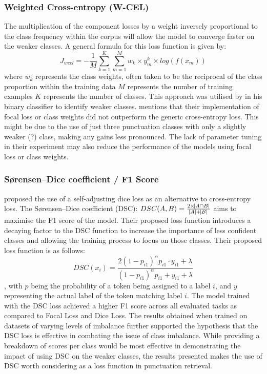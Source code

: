 \documentclass[a4paper]{article}
\begin{document}
\subsubsection{Weighted Cross-entropy (W-CEL)}
The multiplication of the component losses by a weight inversely proportional to the class frequency within the corpus will allow the model to converge faster on the weaker classes. A general formula for this loss function is given by: \[
J_{wcel}=-\frac{1}{M}\sum_{k=1}^{K}\sum_{m=1}^{M}w_k \times y_m^k \times log(f(x_m))
\] where \newline
$w_k$ represents the class weights, often taken to be the reciprocal of the class proportion within the training data \newline
$M$ represents the number of training examples \newline
$K$ represents the number of classes.
This approach was utilised by \cite{adaptivenerunbalanceddata} in his binary classifier to identify weaker classes. \citet{efficientbertrobust} mentions that their implementation of focal loss or class weights did not outperform the generic cross-entropy loss. This might be due to the use of just three punctuation classes with only a slightly weaker (?) class, making any gains less pronounced. The lack of parameter tuning in their experiment may also reduce the performance of the models using focal loss or class weights.

\subsubsection{Sørensen–Dice coefficient / F1 Score}
\citet{li2020dice} proposed the use of a self-adjusting dice loss as an alternative to cross-entropy loss. The Sørensen–Dice coefficient (DSC): $DSC(A,B)=\frac{2 \times\abs{A \cap B}}{\abs{A} + \abs{B}}$ aims to maximise the F1 score of the model. Their proposed loss function introduces a decaying factor to the DSC function to increase the importance of less confident classes and allowing the training process to focus on those classes. Their proposed loss function is as follows: \[
DSC(x_i)=\frac{2{(1-p_{i1})}^{\alpha}p_{i1}\cdot y_{i1}+\lambda}{{(1-p_{i1})}^{\alpha}p_{i1}+ y_{i1}+\lambda}\], with $p$ being the probability of a token being assigned to a label $i$, and $y$ representing the actual label of the token matching label $i$.
The model trained with the DSC loss achieved a higher F1 score across all evaluated tasks as compared to Focal Loss and Dice Loss. The results obtained when trained on datasets of varying levels of imbalance further supported the hypothesis that the DSC loss is effective in combating the issue of class imbalance. While providing a breakdown of scores per class would be most effective in demonstrating the impact of using DSC on the weaker classes, the results presented makes the use of DSC worth considering as a loss function in punctuation retrieval.




\end{document}
